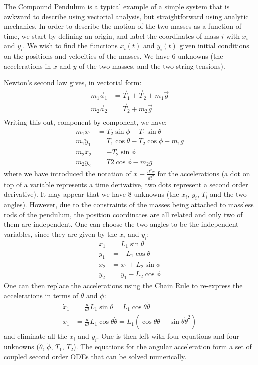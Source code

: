 \begin{example}{0pt}{The Compound Pendulum is a typical example of a simple system that is awkward to describe using vectorial analysis, but straightforward using analytic mechanics.}{}
In order to describe the motion of the two masses as a function of time, we start by defining an origin, and label the coordinates of mass $i$ with $x_i$ and $y_i$. We wish to find the functions $x_i(t)$ and $y_i(t)$ given initial conditions on the positions and velocities of the masses. We have 6 unknowns (the accelerations in $x$ and $y$ of the two masses, and the two string tensions).

Newton's second law gives, in vectorial form:
\begin{align*}
m_1\vec{a}_1&=\vec{T}_1+\vec{T}_2+m_1\vec{g}\\
m_2\vec{a}_2&=\vec{T}_2+m_2\vec{g}\\
\end{align*}
Writing this out, component by component, we have:
\begin{align*}
m_1 \ddot x_1&=T_2\sin\phi-T_1\sin\theta\\
m_1 \ddot y_1&=T_1\cos\theta-T_2\cos\phi-m_1g\\
m_2 \ddot x_2&=-T_2\sin\phi\\
m_2 \ddot y_2&=T2\cos\phi-m_2g
\end{align*}
where we have introduced the notation of $\ddot x \equiv \frac{d^2x}{dt^2}$ for the accelerations (a dot on top of a variable represents a time derivative, two dots represent a second order derivative). It may appear that we have 8 unknowns (the $x_i$, $y_i$, $T_i$ and the two angles). However, due to the constraints of the masses being attached to massless rods of the pendulum, the position coordinates are all related and only two of them are independent. One can choose the two angles to be the independent variables, since they are given by the $x_i$ and $y_i$:
\begin{align*}
x_1&=L_1\sin\theta\\
y_1&=-L_1\cos\theta\\
x_2&=x_1+L_2\sin\phi\\
y_2&=y_1-L_2\cos\phi
\end{align*}
One can then replace the accelerations using the Chain Rule to re-express the accelerations in terms of $\theta$ and $\phi$:
\begin{align*}
\dot x_1&=\frac{d}{dt}L_1\sin\theta=L_1\cos\theta\dot\theta\\
\ddot x_1&=\frac{d}{dt}L_1\cos\theta\dot\theta=L_1(\cos\theta\ddot\theta-\sin\theta\dot\theta^2)
\end{align*}
and eliminate all the $x_i$ and $y_i$. One is then left with four equations and four unknowns ($\ddot\theta$, $\ddot \phi$, $T_1$, $T_2$). The equations for the angular acceleration form a set of coupled second order ODEs that can be solved numerically.


\end{example}
